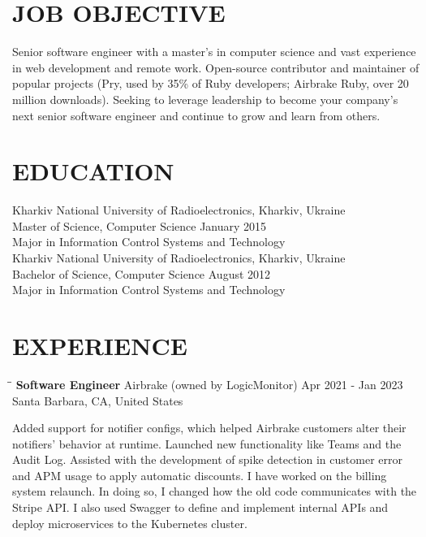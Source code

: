 \documentclass{res}
\begin{document}
\address{Kharkiv, Ukraine\\silin@kyrylo.org\\+380 98 909-30-34}

\begin{resume}

  \section{JOB OBJECTIVE}
  Senior software engineer with a master’s in computer science and vast
  experience in web development and remote work. Open-source contributor and
  maintainer of popular projects (Pry, used by 35\% of Ruby developers; Airbrake
  Ruby, over 20 million downloads). Seeking to leverage leadership to become
  your company’s next senior software engineer and continue to grow and learn
  from others.

  \section{EDUCATION}
  Kharkiv National University of Radioelectronics, Kharkiv, Ukraine \\
  Master of Science, Computer Science \hfill January 2015 \\
  Major in Information Control Systems and Technology \\

  Kharkiv National University of Radioelectronics, Kharkiv, Ukraine \\
  Bachelor of Science, Computer Science \hfill August 2012 \\
  Major in Information Control Systems and Technology \\

  \section{EXPERIENCE}
  \vspace{-0.1in}

  \begin{tabbing}
    \hspace{2.3in}\= \hspace{2.6in}\= \kill
    {\bf Software Engineer}  \>Airbrake (owned by LogicMonitor) \>
    \hspace{-0.2in} Apr 2021 - Jan 2023\\
    \>Santa Barbara, CA, United States
  \end{tabbing}\vspace{-20pt}
  Added support for notifier configs, which helped Airbrake customers alter
  their notifiers' behavior at runtime. Launched new functionality like Teams
  and the Audit Log. Assisted with the development of spike detection in
  customer error and APM usage to apply automatic discounts. I have worked on
  the billing system relaunch. In doing so, I changed how the old code
  communicates with the Stripe API. I also used Swagger to define and implement
  internal APIs and deploy microservices to the Kubernetes cluster.


\end{resume}
\end{document}
